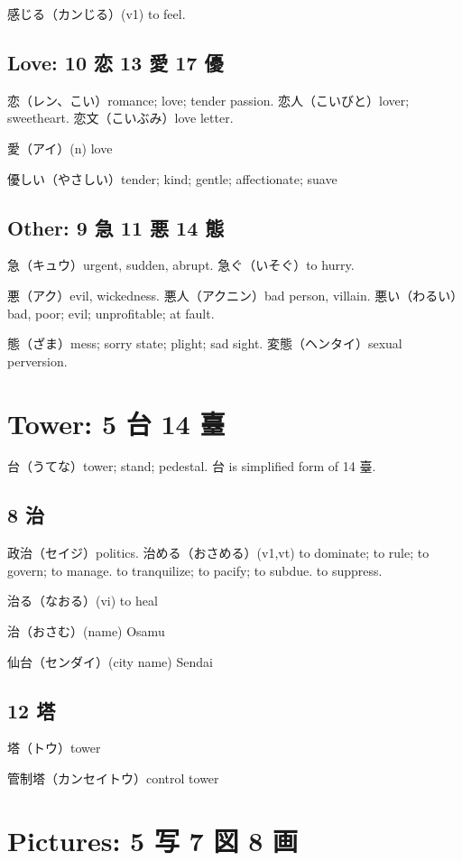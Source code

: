 感じる（カンじる）(v1) to feel.

\subsection{Love: 10 恋 13 愛 17 優}

恋（レン、こい）romance; love; tender passion.
恋人（こいびと）lover; sweetheart.
恋文（こいぶみ）love letter.

愛（アイ）(n) love

優しい（やさしい）tender; kind; gentle; affectionate; suave

\subsection{Other: 9 急 11 悪 14 態}

急（キュウ）urgent, sudden, abrupt.
急ぐ（いそぐ）to hurry.

悪（アク）evil, wickedness.
悪人（アクニン）bad person, villain.
悪い（わるい）bad, poor; evil; unprofitable; at fault.

態（ざま）mess; sorry state; plight; sad sight.
変態（ヘンタイ）sexual perversion.

\section{Tower: 5 台 14 臺}

台（うてな）tower; stand; pedestal.
台 is simplified form of 14 臺.

\subsection{8 治}

政治（セイジ）politics.
治める（おさめる）(v1,vt)
to dominate; to rule; to govern; to manage.
to tranquilize; to pacify; to subdue.
to suppress.

治る（なおる）(vi) to heal

治（おさむ）(name) Osamu

仙台（センダイ）(city name) Sendai

\subsection{12 塔}

塔（トウ）tower

管制塔（カンセイトウ）control tower

\section{Pictures: 5 写 7 図 8 画}

